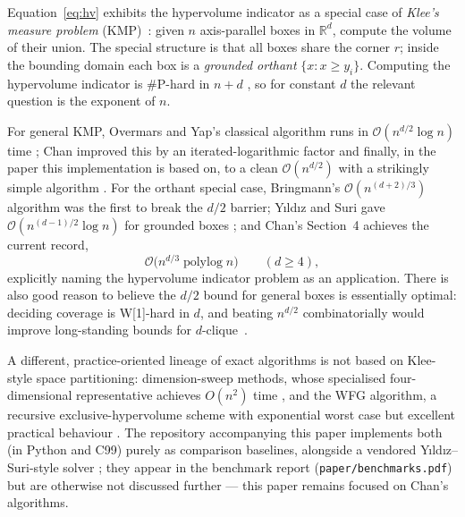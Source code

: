 \documentclass[11pt,a4paper]{article}
\theoremstyle{remark}
\newcommand{\R}{\mathbb{R}}
\newcommand{\Oh}{\mathcal{O}}
\begin{document}
Equation~\eqref{eq:hv} exhibits the hypervolume indicator as a special case of
\emph{Klee's measure problem} (KMP)~\cite{Klee1977}: given $n$ axis-parallel
boxes in $\R^d$, compute the volume of their union.  The special structure is
that all boxes share the corner $r$; inside the bounding domain each box is a
\emph{grounded orthant} $\{x : x \ge y_i\}$.  Computing the hypervolume
indicator is \#P-hard in $n{+}d$ \cite{BeumeEtAl2009}, so for constant $d$ the
relevant question is the exponent of $n$.

For general KMP, Overmars and Yap's classical algorithm runs in
$\Oh(n^{d/2}\log n)$ time \cite{OvermarsYap1991}; Chan improved this by an
iterated-logarithmic factor \cite{Chan2010} and finally, in the paper this
implementation is based on, to a clean $\Oh(n^{d/2})$ with a strikingly simple
algorithm \cite{Chan2013}.  For the orthant special case, Bringmann's
$\Oh(n^{(d+2)/3})$ algorithm \cite{Bringmann2012} was the first to break the
$d/2$ barrier; Yıldız and Suri gave $\Oh(n^{(d-1)/2}\log n)$ for grounded
boxes \cite{YildizSuri2012}; and Chan's Section~4 achieves the current record,
\begin{equation}
\Oh\bigl(n^{d/3}\operatorname{polylog} n\bigr)\qquad (d\ge 4),
\label{eq:dby3}
\end{equation}
explicitly naming the hypervolume indicator problem as an application.  There
is also good reason to believe the $d/2$ bound for general boxes is
essentially optimal: deciding coverage is W[1]-hard in $d$, and beating
$n^{d/2}$ combinatorially would improve long-standing bounds for
$d$-clique~\cite{Chan2013}.

A different, practice-oriented lineage of exact algorithms is not based on
Klee-style space partitioning: dimension-sweep methods, whose specialised
four-dimensional representative achieves $O(n^2)$ time
\cite{GuerreiroFonsecaEmmerich2012}, and the WFG algorithm, a recursive
exclusive-hypervolume scheme with exponential worst case but excellent
practical behaviour \cite{WhileBradstreetBarone2012}.  The repository
accompanying this paper implements both (in Python and C99) purely as
comparison baselines, alongside a vendored Y{\i}ld{\i}z--Suri-style solver
\cite{YildizSuri2012}; they appear in the benchmark report
(\texttt{paper/benchmarks.pdf}) but are otherwise not discussed further ---
this paper remains focused on Chan's algorithms.
\end{document}
